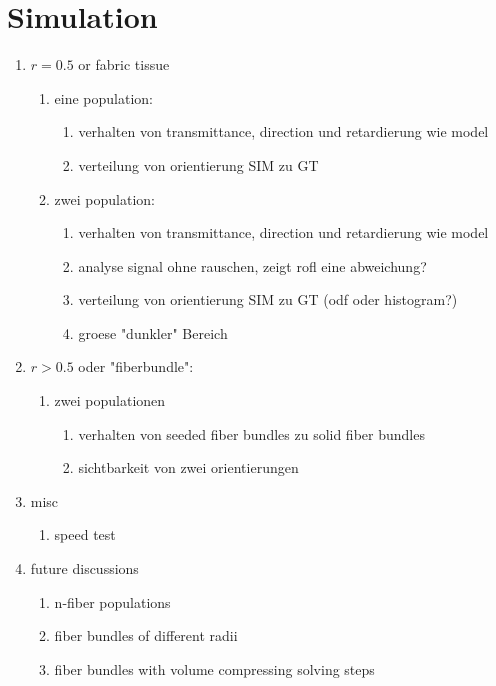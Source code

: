 \section{Simulation}
% 
\begin{enumerate}
\item $r=0.5$ or fabric tissue 
\begin{enumerate}
\item eine population:
\begin{enumerate}
    \item verhalten von transmittance, direction und retardierung wie model
    \item verteilung von orientierung SIM zu GT
\end{enumerate}
% 
\item zwei population:
\begin{enumerate}
    \item verhalten von transmittance, direction und retardierung wie model
    \item analyse signal ohne rauschen, zeigt rofl eine abweichung?
    \item verteilung von orientierung SIM zu GT (odf oder histogram?)
    \item groese "dunkler" Bereich
\end{enumerate}
\end{enumerate}
% 
\item $r > 0.5$ oder "fiberbundle":
\begin{enumerate}
\item zwei populationen
\begin{enumerate}
    \item verhalten von seeded fiber bundles zu solid fiber bundles
    \item sichtbarkeit von zwei orientierungen
\end{enumerate}
\end{enumerate}
% 
\item misc
\begin{enumerate}
    \item speed test
\end{enumerate}
% 
\item future discussions
\begin{enumerate}
    \item n-fiber populations
    \item fiber bundles of different radii
    \item fiber bundles with volume compressing solving steps
\end{enumerate}
\end{enumerate}
% 
